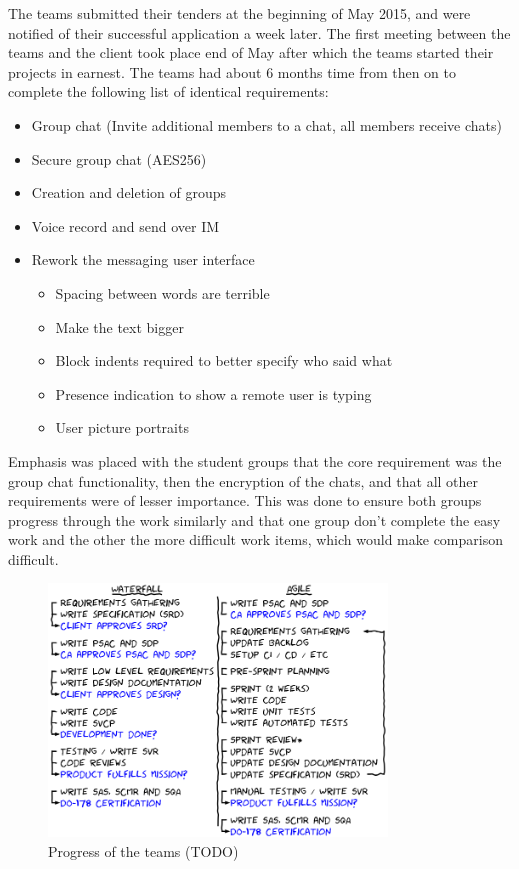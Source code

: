 \documentclass[conference]{IEEEtran}
\begin{document}
The teams submitted their tenders at the beginning of May 2015, and were notified of their successful application a week later. The first meeting between the teams and the client took place end of May after which the teams started their projects in earnest. The teams had about 6 months time from then on to complete the following list of identical requirements:
\begin{itemize}
\item Group chat (Invite additional members to a chat, all members receive chats)
\item Secure group chat (AES256)
\item Creation and deletion of groups
\item Voice record and send over IM
\item Rework the messaging user interface
	\begin{itemize}
	\item Spacing between words are terrible
	\item Make the text bigger
	\item Block indents required to better specify who said what
	\item Presence indication to show a remote user is typing
	\item User picture portraits
	\end{itemize}
\end{itemize}
Emphasis was placed with the student groups that the core requirement was the group chat functionality, then the encryption of the chats, and that all other requirements were of lesser importance. This was done to ensure both groups progress through the work similarly and that one group don't complete the easy work and the other the more difficult work items, which would make comparison difficult.  
 
\begin{figure}[t!]
\centering 
\includegraphics[width=90mm]{agileWaterfallTeamActivities.png}
\caption{Progress of the teams (TODO)}
\end{figure}
\end{document}

